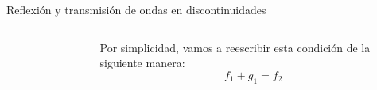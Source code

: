 \documentclass[11pt,handout,aspectratio=1610]{beamer}
\begin{document}
\begin{frame}{Reflexión y transmisión de ondas en discontinuidades}
\begin{columns}
\begin{column}{0.65\textwidth}
\begin{figure}
            \end{figure}
        \end{column}
        ~
        \begin{column}{0.35\textwidth}
            Por simplicidad, vamos a reescribir esta condición de la siguiente manera: $$ f_1 + g_1 = f_2 $$
        \end{column}
    \end{columns}
    
\end{frame}
\end{document}

